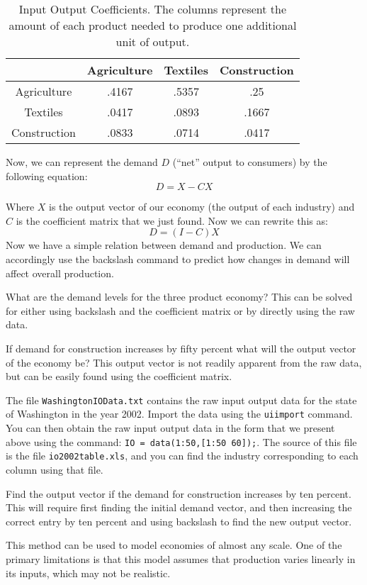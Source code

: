 \begin{table}

\begin{center}
\begin{tabular}{|c|c|c|c|} 
\hline
& Agriculture & Textiles & Construction \\ \hline
Agriculture & .4167 & .5357 & .25 \\ \hline
Textiles & .0417 & .0893 & .1667 \\ \hline
Construction & .0833 & .0714 & .0417 \\ \hline
\end{tabular}
\caption{Input Output Coefficients. The columns represent the amount of each product needed to produce one additional unit of output.} \label{IOCoefTable}
\end{center}
\end{table}

Now, we can represent the demand $D$ (``net'' output to consumers) by the following equation:
\[
D = X-CX
\]

Where $X$ is the output vector of our economy (the output of each industry) and $C$ is the coefficient matrix that we just found. Now we can rewrite this as:
\[
D = (I-C)X
\]
Now we have a simple relation between demand and production. We can accordingly use the backslash command to predict how changes in demand will affect overall production.

\begin{problem}
What are the demand levels for the three product economy? This can be solved for either using backslash and the coefficient matrix or by directly using the raw data.
\end{problem}

\begin{problem}
If demand for construction increases by fifty percent what will the output vector of the economy be? This output vector is not readily apparent from the raw data, but can be easily found using the coefficient matrix.
\end{problem}

\begin{problem}
The file {\tt WashingtonIOData.txt} contains the raw input output data for the state of Washington in the year 2002. Import the data using the {\tt uiimport} command. You can then obtain the raw input output data in the form that we present above using the command: {\tt IO = data(1:50,[1:50 60]);}. The source of this file is the file {\tt io2002table.xls}, and you can find the industry corresponding to each column using that file.

Find the output vector if the demand for construction increases by ten percent. This will require first finding the initial demand vector, and then increasing the correct entry by ten percent and using backslash to find the new output vector.
\end{problem}

This method can be used to model economies of almost any scale. One of the primary limitations is that this model assumes that production varies linearly in its inputs, which may not be realistic.


